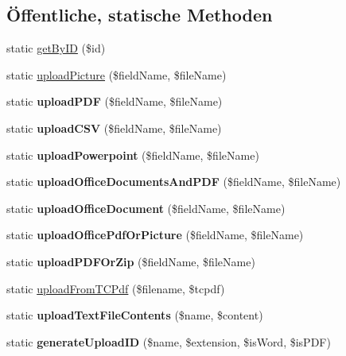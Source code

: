 \subsection*{Öffentliche, statische Methoden}
\begin{DoxyCompactItemize}
\item 
static \mbox{\hyperlink{class_file_upload_ad043afa95b3bf28d82b0b871ae56ca4a}{get\+By\+ID}} (\$id)
\item 
static \mbox{\hyperlink{class_file_upload_a05b1740ac6ccea716e917e90cdc0629b}{upload\+Picture}} (\$field\+Name, \$file\+Name)
\item 
\mbox{\label{class_file_upload_a577dffad4eaf4cf5c7ca4ce55db3d6b3}} 
static {\bfseries upload\+P\+DF} (\$field\+Name, \$file\+Name)
\item 
\mbox{\label{class_file_upload_ad5b68cfd1111453d1271537c7c58f76c}} 
static {\bfseries upload\+C\+SV} (\$field\+Name, \$file\+Name)
\item 
\mbox{\label{class_file_upload_ac2474b1cbf8f42c9d56664841d89be67}} 
static {\bfseries upload\+Powerpoint} (\$field\+Name, \$file\+Name)
\item 
\mbox{\label{class_file_upload_a8c9ced2ebec52deee795927c5fc0f291}} 
static {\bfseries upload\+Office\+Documents\+And\+P\+DF} (\$field\+Name, \$file\+Name)
\item 
\mbox{\label{class_file_upload_a5c6bb7559e43fa6d9ea5f16748960196}} 
static {\bfseries upload\+Office\+Document} (\$field\+Name, \$file\+Name)
\item 
\mbox{\label{class_file_upload_a79ed9ae3a11cdb6bb33f63d7512546f9}} 
static {\bfseries upload\+Office\+Pdf\+Or\+Picture} (\$field\+Name, \$file\+Name)
\item 
\mbox{\label{class_file_upload_a1a6dff8f3cd041125efa6390c7d690da}} 
static {\bfseries upload\+P\+D\+F\+Or\+Zip} (\$field\+Name, \$file\+Name)
\item 
static \mbox{\hyperlink{class_file_upload_a1b0b841e7e21597afb374dc8aa5cd073}{upload\+From\+T\+C\+Pdf}} (\$filename, \$tcpdf)
\item 
\mbox{\label{class_file_upload_a59319495e379d7180963580ac6e0c938}} 
static {\bfseries upload\+Text\+File\+Contents} (\$name, \$content)
\item 
\mbox{\label{class_file_upload_a111c6cc35e2b832dac799f4a5bf08a70}} 
static {\bfseries generate\+Upload\+ID} (\$name, \$extension, \$is\+Word, \$is\+P\+DF)
\end{DoxyCompactItemize}


